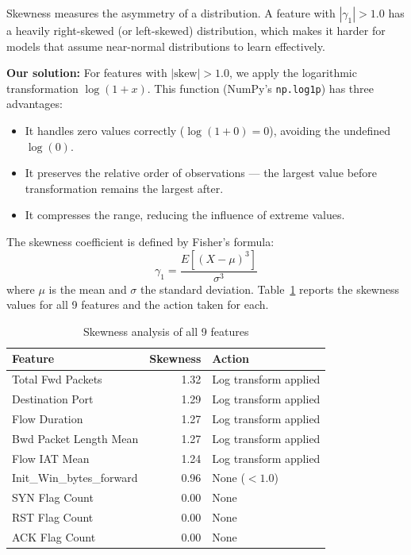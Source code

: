 \documentclass[12pt,a4paper]{report}
\begin{document}
Skewness measures the asymmetry of a distribution. A feature with $|\gamma_1| > 1.0$ has a heavily right-skewed (or left-skewed) distribution, which makes it harder for models that assume near-normal distributions to learn effectively.

\textbf{Our solution:} For features with $|\text{skew}| > 1.0$, we apply the logarithmic transformation $\log(1 + x)$. This function (NumPy's \texttt{np.log1p}) has three advantages:
\begin{itemize}
    \item It handles zero values correctly ($\log(1 + 0) = 0$), avoiding the undefined $\log(0)$.
    \item It preserves the relative order of observations --- the largest value before transformation remains the largest after.
    \item It compresses the range, reducing the influence of extreme values.
\end{itemize}

The skewness coefficient is defined by Fisher's formula:
\begin{equation}
    \gamma_1 = \frac{E[(X - \mu)^3]}{\sigma^3}
\end{equation}
where $\mu$ is the mean and $\sigma$ the standard deviation. Table~\ref{tab:skewness} reports the skewness values for all 9 features and the action taken for each.

\begin{table}[H]
\centering
\caption{Skewness analysis of all 9 features}
\label{tab:skewness}
\begin{tabular}{lrl}
\toprule
\textbf{Feature} & \textbf{Skewness} & \textbf{Action} \\
\midrule
Total Fwd Packets & 1.32 & Log transform applied \\
Destination Port & 1.29 & Log transform applied \\
Flow Duration & 1.27 & Log transform applied \\
Bwd Packet Length Mean & 1.27 & Log transform applied \\
Flow IAT Mean & 1.24 & Log transform applied \\
Init\_Win\_bytes\_forward & 0.96 & None ($< 1.0$) \\
SYN Flag Count & 0.00 & None \\
RST Flag Count & 0.00 & None \\
ACK Flag Count & 0.00 & None \\
\bottomrule
\end{tabular}
\end{table}
\end{document}
